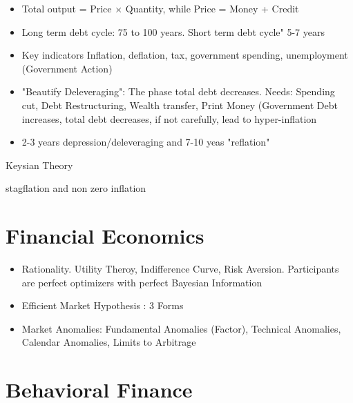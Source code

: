 \documentclass[11pt, openany]{book}              %
\begin{document}
\begin{itemize}
	\item Total output = Price $\times$ Quantity, while Price = Money + Credit
	\item Long term debt cycle: 75 to 100 years. Short term debt cycle" 5-7 years
	\item Key indicators Inflation, deflation, tax, government spending, unemployment (Government Action)
	\item "Beautify Deleveraging": The phase total debt decreases. Needs: Spending cut, Debt Restructuring, Wealth transfer, Print Money (Government Debt increases, total debt decreases, if not carefully, lead to hyper-inflation
	\item 2-3 years depression/deleveraging and 7-10 yeas "reflation"
\end{itemize}

Keysian Theory 

stagflation and non zero inflation


\section{Financial Economics}
\begin{itemize}
    \item Rationality. Utility Theroy, Indifference Curve, Risk Aversion. Participants are perfect optimizers with perfect Bayesian Information
    \item Efficient Market Hypothesis : 3 Forms
    \item Market Anomalies: Fundamental Anomalies (Factor), Technical Anomalies, Calendar Anomalies, Limits to Arbitrage 
\end{itemize}

\section{Behavioral Finance}
\end{document}
